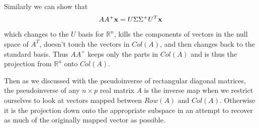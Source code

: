 \documentclass{book}
\begin{document}
Similarly we can show that
$$
AA^+{\bf x}=U\Sigma\Sigma^+U^T{\bf x}
$$
which changes to the $U$ basis for $\mathbb{R}^n$, kills the components of vectors in the null space of $A^T$, doesn't touch the vectors in $Col(A)$, and then changes back to the standard basis. Thus $AA^+$ keeps only the parts in $Col(A)$ and is thus the projection from $\mathbb{R}^n$ onto $Col(A)$. 

Then as we discussed with the pseudoinverse of rectangular diagonal matrices, the pseudoinverse of any $n \times p$ real matrix $A$ is the inverse map when we restrict ourselves to look at vectors mapped between $Row(A)$ and $Col(A)$. Otherwise it is the projection down onto the appropriate subspace in an attempt to recover as much of the originally mapped vector as possible.

\end{document}
